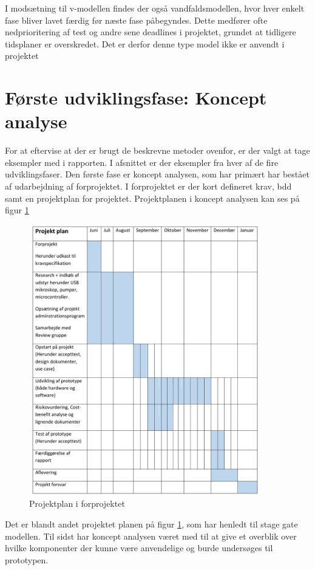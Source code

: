 I modsætning til v-modellen findes der også vandfaldsmodellen, hvor hver enkelt fase bliver lavet færdig før næste fase påbegyndes. Dette medfører ofte nedprioritering af test og andre sene deadlines i projektet, grundet at tidligere tidsplaner er overskredet. Det er derfor denne type model ikke er anvendt i projektet
\newpage

\section{Første udviklingsfase: Koncept analyse}
For at eftervise at der er brugt de beskrevne metoder ovenfor, er der valgt at tage eksempler med i rapporten. I afsnittet er der eksempler fra hver af de fire udviklingsfaser. Den første fase er koncept analysen, som har primært har bestået af udarbejdning af forprojektet. I forprojektet er der kort defineret krav, bdd samt en projektplan for projektet. Projektplanen i koncept analysen kan ses på figur \ref{fig:forprojekt}

\begin{figure}[H]
	\centering
	\includegraphics[width=0.9\textwidth]{billeder/Hovedrapport/forprojektplan.pdf}
	\caption{Projektplan i forprojektet}
	\label{fig:forprojekt}
\end{figure}
Det er blandt andet projektet planen på figur \ref{fig:forprojekt}, som har henledt til stage gate modellen. Til sidst har koncept analysen været med til at give et overblik over hvilke komponenter der kunne være anvendelige og burde undersøges til prototypen.
 
